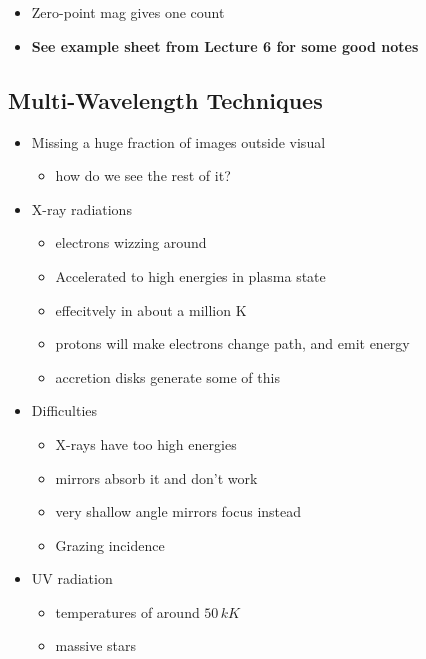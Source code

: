 \documentclass[a4paper,11pt,normalem]{article}
\begin{document}
\section{}
\begin{itemize}
    \item Zero-point mag gives one count
    \item \textbf{See example sheet from Lecture 6 for some good notes}
\end{itemize}

\subsection{Multi-Wavelength Techniques}
\begin{itemize}
    \item Missing a huge fraction of images outside visual
        \begin{itemize}
            \item how do we see the rest of it?
        \end{itemize}
    \item X-ray radiations
        \begin{itemize}
            \item electrons wizzing around
            \item Accelerated to high energies in plasma state
            \item effecitvely in about a million K
            \item protons will make electrons change path, and emit energy
            \item accretion disks generate some of this
        \end{itemize}
    \item Difficulties
        \begin{itemize}
            \item X-rays have too high energies
            \item mirrors absorb it and don't work
            \item very shallow angle mirrors focus instead
            \item Grazing incidence
        \end{itemize}
    \item UV radiation
        \begin{itemize}
            \item temperatures of around \(50 \, kK\)
            \item massive stars

\end{itemize}
\end{itemize}
\end{document}
